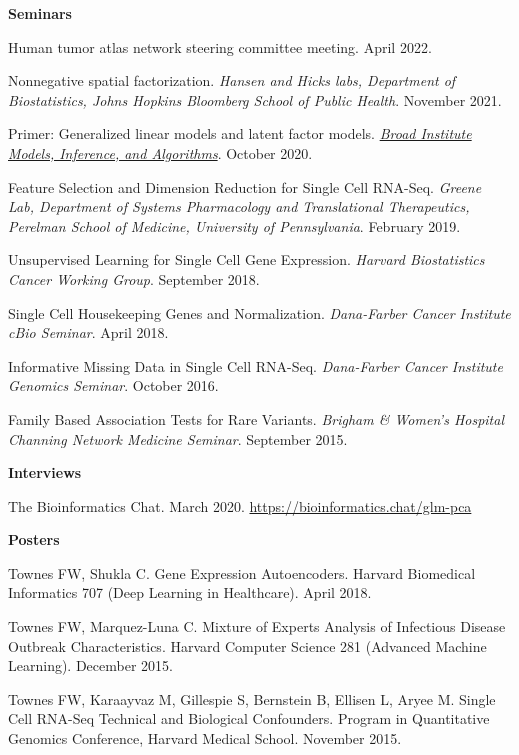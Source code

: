 \documentclass[10pt]{article}
\begin{document}
\textbf{Seminars}
\begin{enumerate}[label= {[\arabic*]}]
\item Human tumor atlas network steering committee meeting. April 2022.
\item Nonnegative spatial factorization. {\it Hansen and Hicks labs, Department of Biostatistics, Johns Hopkins Bloomberg School of Public Health}. November 2021.
\item Primer: Generalized linear models and latent factor models. \href{https://www.broadinstitute.org/talks/primer-generalized-linear-models-and-latent-factor-models}{{\it Broad Institute Models, Inference, and Algorithms}}. October 2020.
\item Feature Selection and Dimension Reduction for Single Cell RNA-Seq. {\it Greene Lab, Department of Systems Pharmacology and Translational Therapeutics, Perelman School of Medicine, University of Pennsylvania}. February 2019.
\item Unsupervised Learning for Single Cell Gene Expression. {\it Harvard Biostatistics Cancer Working Group}. September 2018.
\item Single Cell Housekeeping Genes and Normalization. {\it Dana-Farber Cancer Institute cBio Seminar}. April 2018.
\item Informative Missing Data in Single Cell RNA-Seq. {\it Dana-Farber Cancer Institute Genomics Seminar}. October 2016.
\item Family Based Association Tests for Rare Variants. {\it Brigham \& Women's Hospital Channing Network Medicine Seminar}. September 2015.
\end{enumerate}

\textbf{Interviews}
\begin{enumerate}[label={[\arabic*]}]
\item The Bioinformatics Chat. March 2020. \url{https://bioinformatics.chat/glm-pca}
\end{enumerate}


\textbf{Posters}
\begin{enumerate}[label= {[\arabic*]}]
\item Townes FW, Shukla C. Gene Expression Autoencoders. Harvard Biomedical Informatics 707 (Deep Learning in Healthcare). April 2018.
\item Townes FW, Marquez-Luna C. Mixture of Experts Analysis of Infectious Disease Outbreak Characteristics. Harvard Computer Science 281 (Advanced Machine Learning). December 2015.
\item Townes FW, Karaayvaz M, Gillespie S, Bernstein B, Ellisen L, Aryee M. Single Cell RNA-Seq Technical and Biological Confounders. Program in Quantitative Genomics Conference, Harvard Medical School. November 2015.
\end{enumerate}
\end{document}

